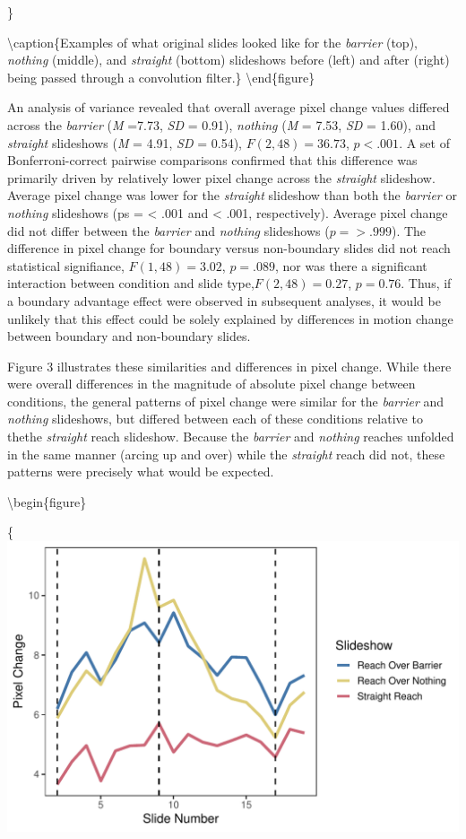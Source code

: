 \documentclass[
  english,
  man,floatsintext]{apa6}
\begin{document}
\}

\textbackslash caption\{Examples of what original slides looked like for the \emph{barrier} (top), \emph{nothing} (middle), and \emph{straight} (bottom) slideshows before (left) and after (right) being passed through a convolution filter.\}\label{fig:fig2}
\textbackslash end\{figure\}

An analysis of variance revealed that overall average pixel change values differed across the \emph{barrier} (\emph{M} =7.73, \emph{SD} = 0.91), \emph{nothing} (\emph{M} = 7.53, \emph{SD} = 1.60), and \emph{straight} slideshows (\emph{M} = 4.91, \emph{SD} = 0.54), \(F(2, 48) = 36.73\), \(p< .001\). A set of Bonferroni-correct pairwise comparisons confirmed that this difference was primarily driven by relatively lower pixel change across the \emph{straight} slideshow. Average pixel change was lower for the \emph{straight} slideshow than both the \emph{barrier} or \emph{nothing} slideshows (ps = \textless{} .001 and \textless{} .001, respectively). Average pixel change did not differ between the \emph{barrier} and \emph{nothing} slideshows (\(p=> .999\)). The difference in pixel change for boundary versus non-boundary slides did not reach statistical signifiance, \(F(1, 48) = 3.02\), \(p =.089\), nor was there a significant interaction between condition and slide type,\(F(2, 48) = 0.27\), \(p =0.76\). Thus, if a boundary advantage effect were observed in subsequent analyses, it would be unlikely that this effect could be solely explained by differences in motion change between boundary and non-boundary slides.

Figure 3 illustrates these similarities and differences in pixel change. While there were overall differences in the magnitude of absolute pixel change between conditions, the general patterns of pixel change were similar for the \emph{barrier} and \emph{nothing} slideshows, but differed between each of these conditions relative to thethe \emph{straight} reach slideshow. Because the \emph{barrier} and \emph{nothing} reaches unfolded in the same manner (arcing up and over) while the \emph{straight} reach did not, these patterns were precisely what would be expected.

\textbackslash begin\{figure\}

\{\centering \includegraphics{kg-paper_files/figure-latex/fig3-1}
\end{document}
